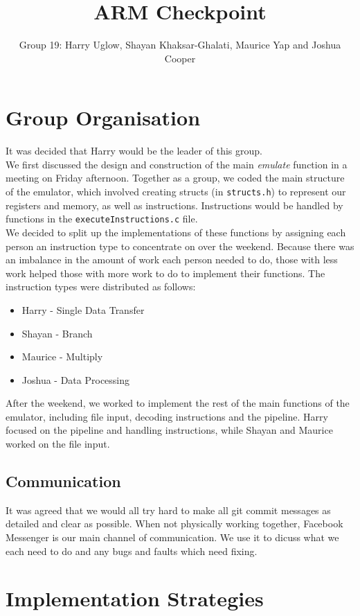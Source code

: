 \documentclass[11pt]{article}
\begin{document}
\title{ARM Checkpoint}
\author{Group 19: Harry Uglow, Shayan Khaksar-Ghalati, Maurice Yap and Joshua Cooper}

\maketitle

\section{Group Organisation}

It was decided that Harry would be the leader of this group.\\

We first discussed the design and construction of the main \textit{emulate} function in a meeting on Friday afternoon. Together as a group, we coded the main structure of the emulator, which involved creating structs (in \texttt{structs.h}) to represent our registers and memory, as well as instructions. Instructions would be handled by functions in the \texttt{executeInstructions.c} file.\\

We decided to split up the implementations of these functions by assigning each person an instruction type to concentrate on over the weekend. Because there was an imbalance in the amount of work each person needed to do, those with less work helped those with more work to do to implement their functions. The instruction types were distributed as follows:\\
\begin{itemize}
\item Harry - Single Data Transfer
\item Shayan - Branch
\item Maurice - Multiply
\item Joshua - Data Processing
\end{itemize}
After the weekend, we worked to implement the rest of the main functions of the emulator, including file input, decoding instructions and the pipeline.  Harry focused on the pipeline and handling instructions, while Shayan and Maurice worked on the file input.

\subsection{Communication}
It was agreed that we would all try hard to make all git commit messages as detailed and clear as possible. When not physically working together, Facebook Messenger is our main channel of communication. We use it to dicuss what we each need to do and any bugs and faults which need fixing.

\section{Implementation Strategies}
\end{document}
